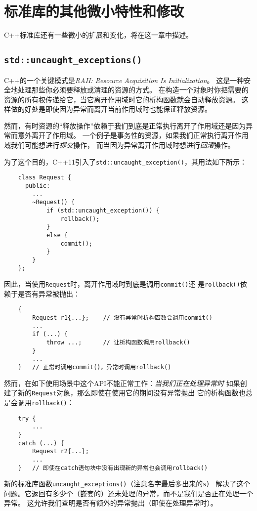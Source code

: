 \chapter{标准库的其他微小特性和修改}\label{ch28}
C++标准库还有一些微小的扩展和变化，将在这一章中描述。


\section{\texttt{std::uncaught\_exceptions()}}
C++的一个关键模式是\emph{RAII: Resource Acquisition Is Initialization}。
这是一种安全地处理那些你必须要释放或清理的资源的方式。
在构造一个对象时你把需要的资源的所有权传递给它，当它离开作用域时它的析构函数就会自动释放资源。
这样做的好处是即使因为异常而离开当前作用域时也能保证释放资源。

然而，有时资源的“释放操作”依赖于我们到底是正常执行离开了作用域还是因为异常而意外离开了作用域。
一个例子是事务性的资源，如果我们正常执行离开作用域我们可能想进行\emph{提交}操作，
而当因为异常离开作用域时想进行\emph{回滚}操作。

为了这个目的，C++11引入了\texttt{std::uncaught\_exception()}，其用法如下所示：
\begin{lstlisting}
    class Request {
      public:
        ...
        ~Request() {
            if (std::uncaught_exception()) {
                rollback();
            }
            else {
                commit();
            }
        }
    };
\end{lstlisting}
因此，当使用\texttt{Request}时，离开作用域时到底是调用\texttt{commit()}还
是\texttt{rollback()}依赖于是否有异常被抛出：
\begin{lstlisting}
    {
        Request r1{...};    // 没有异常时析构函数会调用commit()
        ...
        if (...) {
            throw ...;      // 让析构函数调用rollback()
        }
        ...
    }   // 正常时调用commit()，异常时调用rollback()
\end{lstlisting}
然而，在如下使用场景中这个API不能正常工作：\emph{当我们正在处理异常时}
如果创建了新的\texttt{Request}对象，那么即使在使用它的期间没有异常抛出
它的析构函数也总是会调用\texttt{rollback()}：
\begin{lstlisting}
    try {
        ...
    }
    catch (...) {
        Request r2{...};
        ...
    }   // 即使在catch语句块中没有出现新的异常也会调用rollback()
\end{lstlisting}
新的标准库函数\texttt{uncaught\_exceptions()}（注意名字最后多出来的\texttt{s}）
解决了这个问题。它返回有多少个（嵌套的）还未处理的异常，而不是我们是否正在处理一个异常。
这允许我们查明是否有额外的异常抛出（即使在处理异常时）。

